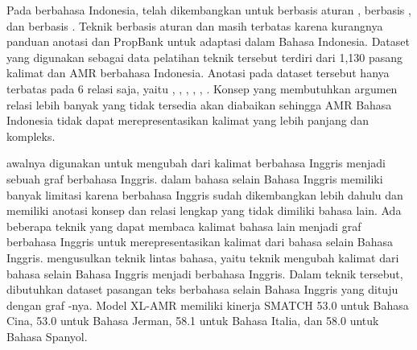 Pada \AMR{} berbahasa Indonesia, telah dikembangkan untuk  berbasis aturan , berbasis  , dan berbasis \crosslingual{} .
Teknik \amrparsing{} berbasis aturan dan  masih terbatas karena kurangnya panduan anotasi dan PropBank untuk adaptasi \AMR{} dalam Bahasa Indonesia.
Dataset yang digunakan sebagai data pelatihan teknik tersebut terdiri dari 1,130 pasang kalimat dan AMR berbahasa Indonesia.
Anotasi pada dataset tersebut hanya terbatas pada 6 relasi saja, yaitu , , , , ,  .
Konsep yang membutuhkan argumen relasi lebih banyak yang tidak tersedia akan diabaikan sehingga AMR Bahasa Indonesia tidak dapat merepresentasikan kalimat yang lebih panjang dan kompleks.

\amrparsing{} awalnya digunakan untuk mengubah dari kalimat berbahasa Inggris menjadi sebuah graf \AMR{} berbahasa Inggris.
\AMR{} dalam bahasa selain Bahasa Inggris memiliki banyak limitasi karena \AMR{} berbahasa Inggris sudah dikembangkan lebih dahulu dan memiliki anotasi konsep dan relasi lengkap yang tidak dimiliki \AMR{} bahasa lain.
Ada beberapa teknik yang dapat membaca kalimat bahasa lain menjadi graf \AMR{} berbahasa Inggris untuk merepresentasikan kalimat dari bahasa selain Bahasa Inggris.
\textcite{damonte2018} mengusulkan teknik \amrparsing{} lintas bahasa, yaitu teknik mengubah kalimat dari bahasa selain Bahasa Inggris menjadi \AMR{} berbahasa Inggris.
Dalam teknik tersebut, dibutuhkan dataset pasangan teks berbahasa selain Bahasa Inggris yang dituju dengan graf \AMR{}-nya.
Model \gls{XL-AMR} memiliki kinerja SMATCH 53.0 untuk Bahasa Cina, 53.0 untuk Bahasa Jerman, 58.1 untuk Bahasa Italia, dan 58.0 untuk Bahasa Spanyol.

